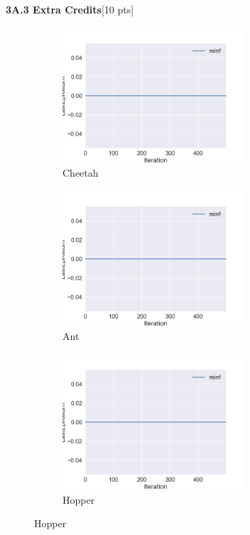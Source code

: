 \documentclass[10pt]{article}
\begin{document}
\clearpage
\textbf{3A.3 Extra Credits}[10 pts]
\begin{figure}[ht!]
    \centering
    \begin{subfigure}[h]{0.6\linewidth}
        \centering
        \includegraphics[height=2in]{figures/ph_sac.png}
        \caption{Cheetah}
    \end{subfigure}
    \vskip 0.3in
    \begin{subfigure}[h]{0.6\textwidth}
        \centering
        \includegraphics[height=2in]{figures/ph_sac.png}
        \caption{Ant}
    \end{subfigure}
    \vskip 0.3in
    \begin{subfigure}[h]{0.6\textwidth}
        \centering
        \includegraphics[height=2in]{figures/ph_sac.png}
        \caption{Hopper}
    \end{subfigure}
\end{figure}
\end{document}
